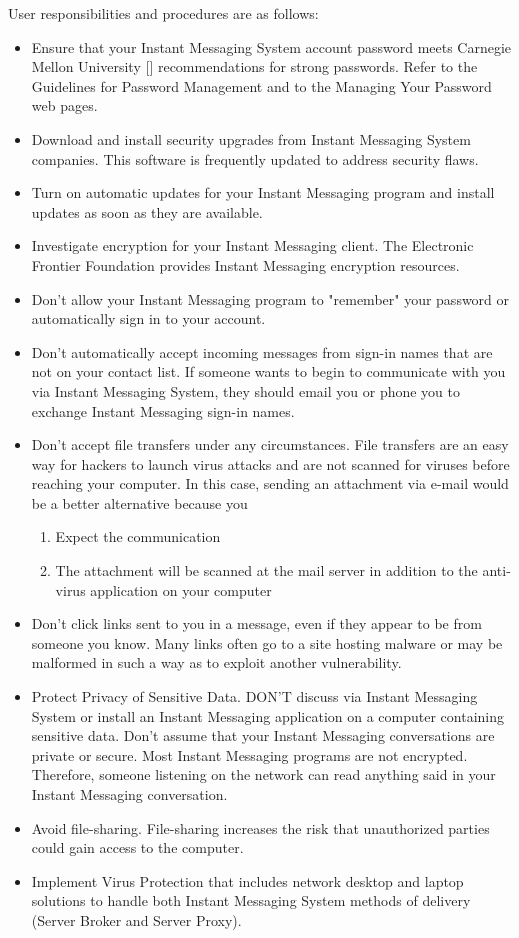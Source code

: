 User responsibilities and procedures are as follows:
\begin{itemize}
    \item Ensure that your Instant Messaging System account password meets Carnegie Mellon
    University [\cite{shay2010encountering}] recommendations for strong passwords.
    Refer to the Guidelines for Password Management and to the Managing Your Password web pages.
    \item Download and install security upgrades from Instant Messaging System companies.
    This software is frequently updated to address security flaws.
    \item Turn on automatic updates for your Instant Messaging program and install updates as soon as they are available.
    \item Investigate encryption for your Instant Messaging client.
    The Electronic Frontier Foundation provides Instant Messaging encryption resources.
    \item Don't allow your Instant Messaging program to "remember" your password or automatically sign in to your account.
    \item Don't automatically accept incoming messages from sign-in names that are not on your contact list.
    If someone wants to begin to communicate with you via Instant Messaging System,
    they should email you or phone you to exchange Instant Messaging sign-in names.
    \item Don't accept file transfers under any circumstances.
    File transfers are an easy way for hackers to launch virus attacks and are not scanned for viruses before reaching your computer.
    In this case, sending an attachment via e-mail would be a better alternative because you
    \begin{enumerate}
        \item Expect the communication
        \item The attachment will be scanned at the mail server in addition to the anti-virus application on your computer
    \end{enumerate}
    \item Don't click links sent to you in a message, even if they appear to be from someone you know.
    Many links often go to a site hosting malware or may be malformed in such a way as to exploit another vulnerability.
    \item Protect Privacy of Sensitive Data.
    DON'T discuss via Instant Messaging System or install an Instant Messaging application on a computer containing sensitive data.
    Don't assume that your Instant Messaging conversations are private or secure.
    Most Instant Messaging programs are not encrypted.
    Therefore, someone listening on the network can read anything said in your Instant Messaging conversation.
    \item Avoid file-sharing.
    File-sharing increases the risk that unauthorized parties could gain access to the computer.
    \item Implement Virus Protection that includes network desktop and laptop solutions to handle both Instant Messaging System
    methods of delivery (Server Broker and Server Proxy).
\end{itemize}
